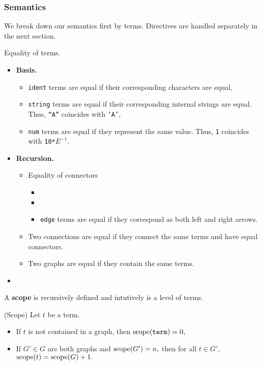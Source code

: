 \subsubsection*{Semantics}
We break down our semantics first by terms. Directives are handled separately in the next section.
\begin{definition}
Equality of terms.
\begin{itemize}
  \item \textbf{Basis.}
	\begin{itemize}
	  \item \texttt{ident} terms are equal if their corresponding characters are equal,
      \item \texttt{string} terms are equal if their corresponding internal strings are equal. Thus, \texttt{``A''} coincides with \texttt{'A'},
	  \item \texttt{num} terms are equal if they represent the same value. Thus, \texttt{1} coincides with \texttt{10*$E^{-1}$}.
	\end{itemize}
  \item \textbf{Recursion.}
		\begin{itemize}
		  \item Equality of connectors
				\begin{itemize}
				  \item
				  \item
				  \item \texttt{edge} terms are equal if they correspond as both left and right arrows.
				\end{itemize}

		  \item Two connections are equal if they connect the same terms and have equal connectors.
		  \item Two graphs are equal if they contain the same terms.
	\end{itemize}

\item
\end{itemize}
\end{definition}
A \textbf{scope} is recursively defined and intutively is a level of terms.
\begin{definition} (Scope)
 Let $t$ be a term.
  \begin{itemize}
	\item If $t$ is not contained in a graph, then $\textrm{scope}(\texttt{term}) = 0,$
	\item If $G' \in G$ are both graphs and $\textrm{scope}(G') = n,$ then for all $t \in G',$ $\textrm{scope}(t) = \textrm{scope}(G) + 1.$
\end{itemize}
\end{definition}
